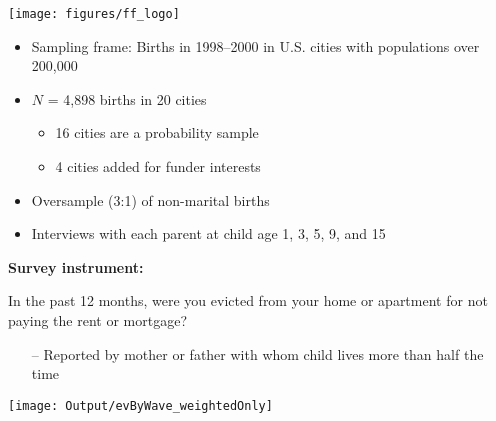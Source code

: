 \documentclass{beamer}
\newcommand\bblue[1]{{\color{blue}\textbf{#1}}}
\begin{document}
\begin{frame}
\texttt{[image: figures/ff\_logo]}
\begin{itemize}
\item Sampling frame: Births in 1998--2000 in U.S. cities with populations over 200,000
\item $N$ = 4,898 births in 20 cities
\begin{itemize}
\item 16 cities are a probability sample
\item 4 cities added for funder interests
\end{itemize}
\item Oversample (3:1) of non-marital births
\item Interviews with each parent at child age 1, 3, 5, 9, and 15
\end{itemize}
\end{frame}

\begin{frame}
\bblue{Survey instrument:}
\begin{center}
In the past 12 months, were you evicted from your home or apartment for not paying the rent or mortgage?
\end{center}
\begin{itemize}
\item[--] Reported by mother or father with whom child lives more than half the time
\end{itemize}
\end{frame}

\begin{frame}
\texttt{[image: Output/evByWave\_weightedOnly]}
\end{frame}
\end{document}
